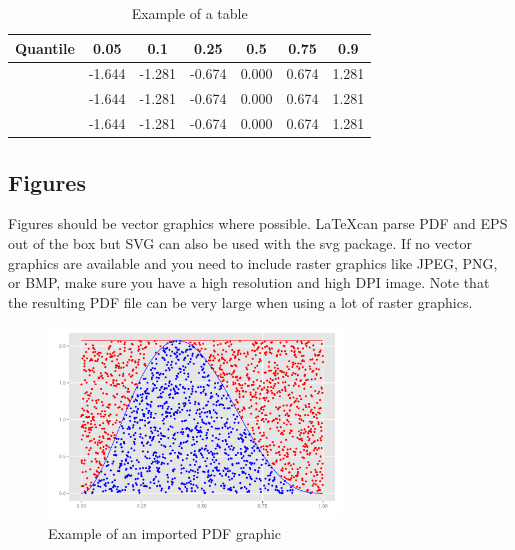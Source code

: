 \documentclass[bachelorthesis, deutsch]{syssec-thesis} %
\begin{document}
\begin{table}[ht]
\begin{center}
        \begin{tabu}{
            X
            S[table-format=-1.3]
            S[table-format=-1.3]
            S[table-format=-1.3]
            S[table-format=-1.3]
            S[table-format=-1.3]
            S[table-format=-1.3]}
            \toprule
            {Quantile} & 0.05 & 0.1 & 0.25 & 0.5 & 0.75 & 0.9 \\ 
            \midrule
             & -1.644 & -1.281 & -0.674 & 0.000 & 0.674 & 1.281 \\ 
             & -1.644 & -1.281 & -0.674 & 0.000 & 0.674 & 1.281 \\ 
             & -1.644 & -1.281 & -0.674 & 0.000 & 0.674 & 1.281 \\ 
             \bottomrule
        \end{tabu}
	\caption{Example of a table}
	\label{table:1}
\end{center}
\end{table}

\subsection{Figures}

Figures should be vector graphics where possible. \LaTeX can parse PDF and EPS out of the box but SVG can also be used with the svg package. If no vector graphics are available and you need to include raster graphics like JPEG, PNG, or BMP, make sure you have a high resolution and high DPI image. Note that the resulting PDF file can be very large when using a lot of raster graphics.


\begin{figure}[ht]
	\centering
	\includegraphics[height=5.1cm]{graphics/demo-graphic.pdf}
	\caption{Example of an imported PDF graphic}
	\label{figure:1}
\end{figure}


\end{document}
